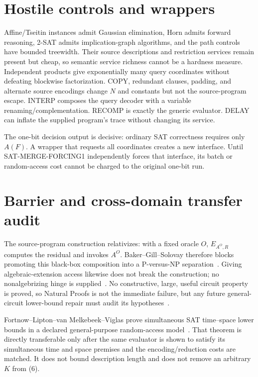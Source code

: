 \documentclass[11pt]{article}
\begin{document}
\section{Hostile controls and wrappers}
Affine/Tseitin instances admit Gaussian elimination, Horn admits forward
reasoning, 2-SAT admits implication-graph algorithms, and the path controls
have bounded treewidth.  Their source descriptions and restriction services
remain present but cheap, so semantic service richness cannot be a hardness
measure.  Independent products give exponentially many query coordinates
without defeating blockwise factorization.  COPY, redundant clauses,
padding, and alternate source encodings change $N$ and constants but not the
source-program escape.  INTERP composes the query decoder with a variable
renaming/complementation.  RECOMP is exactly the generic evaluator.  DELAY
can inflate the supplied program's trace without changing its service.

The one-bit decision output is decisive: ordinary SAT correctness requires
only $A(F)$.  A wrapper that requests all coordinates creates a new interface.
Until \textsf{SAT-MERGE-FORCING1} independently forces that interface, its
batch or random-access cost cannot be charged to the original one-bit run.

\section{Barrier and cross-domain transfer audit}
The source-program construction relativizes: with a fixed oracle $O$,
$E_{A^O,R}$ computes the residual and invokes $A^O$.  Baker--Gill--Solovay
therefore blocks promoting this black-box composition into a P-versus-NP
separation~\cite{bgs}.  Giving algebraic-extension access likewise does not
break the construction; no nonalgebrizing hinge is supplied~\cite{aw}.
No constructive, large, useful circuit property is proved, so Natural Proofs
is not the immediate failure, but any future general-circuit lower-bound
repair must audit its hypotheses~\cite{rr}.

Fortnow--Lipton--van Melkebeek--Viglas prove simultaneous SAT time--space
lower bounds in a declared general-purpose random-access model~\cite{flmv}.
That theorem is directly transferable only after the same evaluator is shown
to satisfy its simultaneous time and space premises and the encoding/reduction
costs are matched.  It does not bound description length and does not remove
an arbitrary $K$ from (6).
\end{document}
